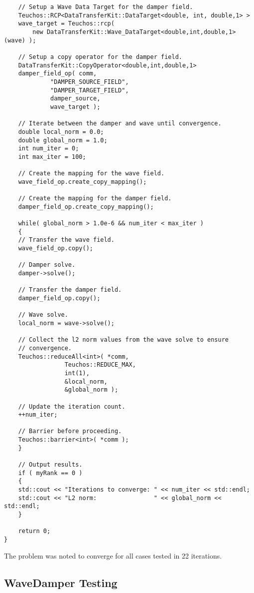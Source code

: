 \documentclass[letterpaper]{article}
\begin{document}
\begin{lstlisting}
    // Setup a Wave Data Target for the damper field.
    Teuchos::RCP<DataTransferKit::DataTarget<double, int, double,1> > 
	wave_target = Teuchos::rcp( 
	    new DataTransferKit::Wave_DataTarget<double,int,double,1>(wave) );

    // Setup a copy operator for the damper field.
    DataTransferKit::CopyOperator<double,int,double,1> 
	damper_field_op( comm,
			 "DAMPER_SOURCE_FIELD",
			 "DAMPER_TARGET_FIELD",
			 damper_source,
			 wave_target );

    // Iterate between the damper and wave until convergence.
    double local_norm = 0.0;
    double global_norm = 1.0;
    int num_iter = 0;
    int max_iter = 100;

    // Create the mapping for the wave field.
    wave_field_op.create_copy_mapping();

    // Create the mapping for the damper field.
    damper_field_op.create_copy_mapping();

    while( global_norm > 1.0e-6 && num_iter < max_iter )
    {
	// Transfer the wave field.
	wave_field_op.copy();

	// Damper solve.
	damper->solve();

	// Transfer the damper field.
	damper_field_op.copy();

	// Wave solve.
	local_norm = wave->solve();

	// Collect the l2 norm values from the wave solve to ensure
	// convergence. 
	Teuchos::reduceAll<int>( *comm,
				 Teuchos::REDUCE_MAX, 
				 int(1), 
				 &local_norm, 
				 &global_norm );

	// Update the iteration count.
	++num_iter;

	// Barrier before proceeding.
	Teuchos::barrier<int>( *comm );
    }

    // Output results.
    if ( myRank == 0 )
    {
	std::cout << "Iterations to converge: " << num_iter << std::endl;
	std::cout << "L2 norm:                " << global_norm << std::endl;
    }

    return 0;
}
\end{lstlisting}

The problem was noted to converge for all cases tested in 22 iterations.

\subsection{WaveDamper Testing}
\end{document}
